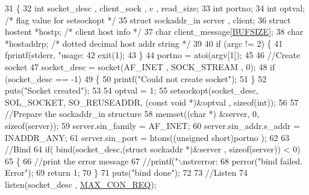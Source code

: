 \begin{DoxyCode}
31 \{
32         \textcolor{keywordtype}{int} socket\_desc , client\_sock , c , read\_size;
33         \textcolor{keywordtype}{int} portno;
34         \textcolor{keywordtype}{int} optval; \textcolor{comment}{/* flag value for setsockopt */}
35         \textcolor{keyword}{struct }sockaddr\_in server , client;
36         \textcolor{keyword}{struct }hostent *hostp; \textcolor{comment}{/* client host info */}
37         \textcolor{keywordtype}{char} client\_message[\hyperlink{_g-2361-06-_p1-echo__server_8c_aeca034f67218340ecb2261a22c2f3dcd}{BUFSIZE}];
38         \textcolor{keywordtype}{char} *hostaddrp; \textcolor{comment}{/* dotted decimal host addr string */}
39          
40         \textcolor{keywordflow}{if} (argc != 2) \{
41                 fprintf(stderr, \textcolor{stringliteral}{"usage: %
42                 exit(1);
43         \}
44         portno = atoi(argv[1]);
45         
46         \textcolor{comment}{//Create socket}
47         socket\_desc = socket(AF\_INET , SOCK\_STREAM , 0);
48         \textcolor{keywordflow}{if} (socket\_desc == -1)
49         \{
50                 printf(\textcolor{stringliteral}{"Could not create socket"});
51         \}
52         puts(\textcolor{stringliteral}{"Socket created"});
53         
54         optval = 1;
55         setsockopt(socket\_desc, SOL\_SOCKET, SO\_REUSEADDR, (\textcolor{keyword}{const} \textcolor{keywordtype}{void} *)&optval , \textcolor{keyword}{sizeof}(\textcolor{keywordtype}{int}));
56 
57         \textcolor{comment}{//Prepare the sockaddr\_in structure}
58         memset((\textcolor{keywordtype}{char} *) &server, 0, \textcolor{keyword}{sizeof}(server));
59         server.sin\_family = AF\_INET;
60         server.sin\_addr.s\_addr = INADDR\_ANY;
61         server.sin\_port = htons((\textcolor{keywordtype}{unsigned} \textcolor{keywordtype}{short})portno );
62          
63         \textcolor{comment}{//Bind}
64         \textcolor{keywordflow}{if}( bind(socket\_desc,(\textcolor{keyword}{struct} sockaddr *)&server , \textcolor{keyword}{sizeof}(server)) < 0)
65         \{
66                 \textcolor{comment}{//print the error message}
67                 \textcolor{comment}{//printf("\(\backslash\)nstrerror: %
68                 perror(\textcolor{stringliteral}{"bind failed. Error"});
69                 \textcolor{keywordflow}{return} 1;
70         \}
71         puts(\textcolor{stringliteral}{"bind done"});
72          
73         \textcolor{comment}{//Listen}
74         listen(socket\_desc , \hyperlink{_g-2361-06-_p1-echo__server_8c_a3e4b4faa36cc9e3a7d9895aec8f27592}{MAX\_CON\_REQ});
}}
\end{DoxyCode}
